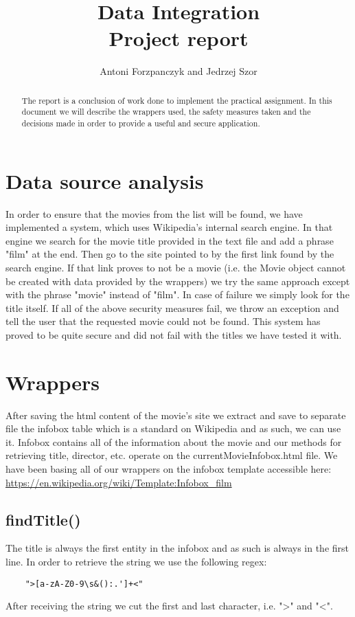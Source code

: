 \documentclass[a4paper,12pt]{article}
\begin{document}
	
\title{Data Integration\\Project report}
\author{Antoni Forzpanczyk and Jedrzej Szor}

\maketitle

\begin{abstract}
The report is a conclusion of work done to implement the practical assignment. In this document we will describe the wrappers used, the safety measures taken and the decisions made in order to provide a useful and secure application.
\end{abstract}

\section{Data source analysis}
In order to ensure that the movies from the list will be found, we have implemented a system, which uses Wikipedia's internal search engine. In that engine we search for the movie title provided in the text file and add a phrase "film" at the end. Then go to the site pointed to by the first link found by the search engine. If that link proves to not be a movie (i.e. the Movie object cannot be created with data provided by the wrappers) we try the same approach except with the phrase "movie" instead of "film". In case of failure we simply look for the title itself. If all of the above security measures fail, we throw an exception and tell the user that the requested movie could not be found. This system has proved to be quite secure and did not fail with the titles we have tested it with.

\section{Wrappers}
After saving the html content of the movie's site we extract and save to separate file the infobox table which is a standard on Wikipedia and as such, we can use it. Infobox contains all of the information about the movie and our methods for retrieving title, director, etc. operate on the currentMovieInfobox.html file. We have been basing all of our wrappers on the infobox template accessible here: \url{https://en.wikipedia.org/wiki/Template:Infobox_film}

\subsection{findTitle()}
The title is always the first entity in the infobox and as such is always in the first line. In order to retrieve the string we use the following regex:
\begin{lstlisting}
	">[a-zA-Z0-9\s&():.']+<"
\end{lstlisting}
After receiving the string we cut the first and last character, i.e. ">" and "<".
\end{document}
